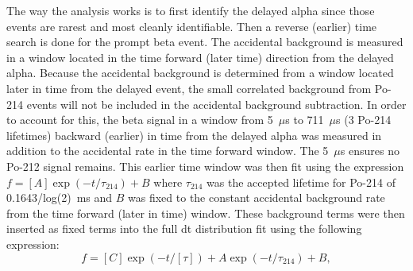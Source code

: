 The way the analysis works is to first identify the delayed alpha since those events are rarest and most cleanly identifiable. Then a reverse (earlier) time search is done for the prompt beta event. The accidental background is measured in a window located in the time forward (later time) direction from the delayed alpha. Because the accidental background is determined from a window located later in time from the delayed event, the small correlated background from Po-214 events will not be included in the accidental background subtraction. In order to account for this, the beta signal in a window from 5~$\mu$s to 711~$\mu$s (3 Po-214 lifetimes) backward (earlier) in time from the delayed alpha  was measured in addition to the accidental rate in the time forward window. The 5~$\mu$s ensures no Po-212 signal remains. This earlier time window was then fit using the expression $f=[A]\exp{(-t/\tau_{214})}+B$ where $\tau_{214}$ was the accepted lifetime for Po-214 of 0.1643/log(2)~ms and $B$ was fixed to the constant accidental background rate from the time forward (later in time) window. These background terms were then inserted as fixed terms into the full dt distribution fit using the following expression:
\begin{equation}
f=[C]\exp{(-t/[\tau])}+A\exp{(-t/\tau_{214})}+B,
\label{eqn:fdecay}
\end{equation}
